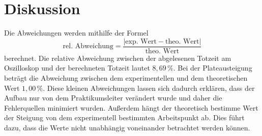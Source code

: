 \section{Diskussion}
\label{sec:Diskussion}
Die Abweichungen werden mithilfe der Formel
\begin{equation*}
    \text{rel. Abweichung} = \frac{|\text{exp. Wert} - \text{theo. Wert}|}{\text{theo. Wert}}
  \end{equation*}
berechnet. 
Die relative Abweichung zwischen der abgelesenen Totzeit am Oszilloskop und der berechneten Totzeit lautet $8,69\,\%$. 
Bei der Plateausteigung beträgt die Abweichung zwischen dem experimentellen und dem theoretischen Wert $1,00\,\%$. 
Diese kleinen Abweichungen lassen sich dadurch erklären, dass der Aufbau nur von dem Praktikumsleiter verändert wurde und daher 
die Fehlerquellen minimiert wurden. Außerdem hängt der theoretisch bestimme Wert der Steigung von dem experimentell bestimmten Arbeitspunkt
ab. Dies führt dazu, dass die Werte nicht unabhängig voneinander betrachtet werden können.
